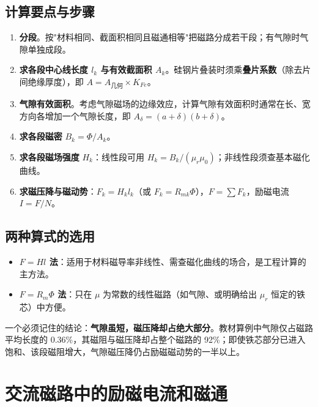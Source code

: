 \subsection{计算要点与步骤}
\begin{enumerate}
  \item \textbf{分段}。按"材料相同、截面积相同且磁通相等"把磁路分成若干段；有气隙时气隙单独成段。
  \item \textbf{求各段中心线长度 $l_k$ 与有效截面积 $A_k$}。硅钢片叠装时须乘\textbf{叠片系数}（除去片间绝缘厚度），即 $A=A_{\text{几何}}\times K_{Fe}$。
  \item \textbf{气隙有效面积}。考虑气隙磁场的边缘效应，计算气隙有效面积时通常在长、宽方向各增加一个气隙长度，即 $A_\delta=(a+\delta)(b+\delta)$。
  \item \textbf{求各段磁密} $B_k=\Phi/A_k$。
  \item \textbf{求各段磁场强度} $H_k$：线性段可用 $H_k=B_k/(\mu_r\mu_0)$；非线性段须查基本磁化曲线。
  \item \textbf{求磁压降与磁动势}：$F_k=H_kl_k$（或 $F_k=R_{mk}\Phi$），$F=\sum F_k$，励磁电流 $I=F/N$。
\end{enumerate}

\subsection{两种算式的选用}
\begin{itemize}
  \item \textbf{$F=Hl$ 法}：适用于材料磁导率非线性、需查磁化曲线的场合，是工程计算的主方法。
  \item \textbf{$F=R_m\Phi$ 法}：只在 $\mu$ 为常数的线性磁路（如气隙、或明确给出 $\mu_r$ 恒定的铁芯）中方便。
\end{itemize}

一个必须记住的结论：\textbf{气隙虽短，磁压降却占绝大部分}。教材算例中气隙仅占磁路平均长度的 0.36\%，其磁阻与磁压降却占整个磁路的 92\%；即使铁芯部分已进入饱和、该段磁阻增大，气隙磁压降仍占励磁磁动势的一半以上。


\section{交流磁路中的励磁电流和磁通}

